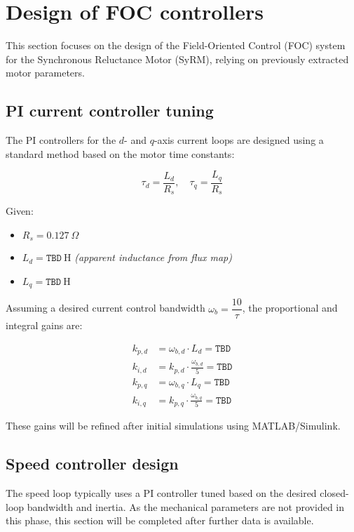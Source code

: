 \section{Design of FOC controllers} 

\label{sec:FOC}

This section focuses on the design of the Field-Oriented Control (FOC) system for the Synchronous Reluctance Motor (SyRM), relying on previously extracted motor parameters.

\subsection{PI current controller tuning}

The PI controllers for the $d$- and $q$-axis current loops are designed using a standard method based on the motor time constants:

\begin{equation}
\tau_d = \frac{L_d}{R_s}, \quad \tau_q = \frac{L_q}{R_s}
\end{equation}

Given:
\begin{itemize}
    \item $R_s = 0.127~\Omega$
    \item $L_d = \texttt{TBD}~\text{H}$ \hfill \textit{\footnotesize (apparent inductance from flux map)}
    \item $L_q = \texttt{TBD}~\text{H}$
\end{itemize}

Assuming a desired current control bandwidth $\omega_b = \dfrac{10}{\tau}$, the proportional and integral gains are:

\begin{align}
k_{p,d} &= \omega_{b,d} \cdot L_d = \texttt{TBD} \\
k_{i,d} &= k_{p,d} \cdot \frac{\omega_{b,d}}{5} = \texttt{TBD} \\
k_{p,q} &= \omega_{b,q} \cdot L_q = \texttt{TBD} \\
k_{i,q} &= k_{p,q} \cdot \frac{\omega_{b,q}}{5} = \texttt{TBD}
\end{align}

These gains will be refined after initial simulations using MATLAB/Simulink.

\subsection{Speed controller design}

The speed loop typically uses a PI controller tuned based on the desired closed-loop bandwidth and inertia. As the mechanical parameters are not provided in this phase, this section will be completed after further data is available.

\vspace{2cm} %
